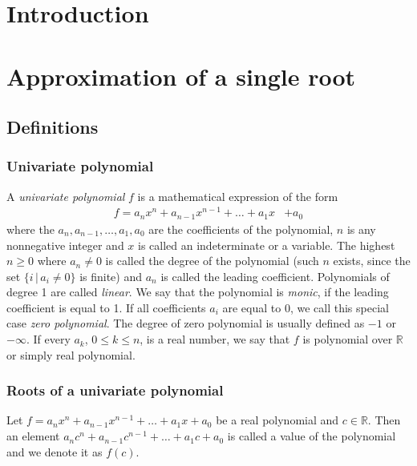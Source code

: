 \documentclass[
  digital, %
  notable,   %
  nolof,     %
  nolot,     %
	draft, %
]{fithesis3}
\begin{document}
\newtheorem{theorem}{Theorem}[section] %
\newtheorem{corollary}[theorem]{Corollary}
\chapter{Introduction}


\chapter{Approximation of a single root}
\section{Definitions}
\subsection{Univariate polynomial}
A \emph{univariate polynomial} $f$ is a mathematical expression of the form
\begin{align}
       f = a_{n}x^{n}  +  a_{n-1}x^{n-1} +  \ldots  +  a_{1}x  &+  a_{0} \label{eq:polynom}
\end{align}
\newcommand{\R}{\mathbb{R}}
\newcommand{\N}{\mathbb{N}}
where the $a_{n}, a_{n-1}, \ldots, a_{1}, a_{0}$  are the coefficients of the polynomial, $n$ is any nonnegative integer and $x$ is called an indeterminate or a variable.  The highest $n \geq 0$ where $a_{n} \neq 0$ is called the degree of the polynomial (such $n$ exists, since the set $\{i \, | \, a_{i} \neq 0 \}$ is finite) and $a_{n}$ is called the leading coefficient. Polynomials of degree 1 are called \emph{linear}. We say that the polynomial is \emph{monic}, if the leading coefficient is equal to 1. If all coefficients $a_{i}$ are equal to $0$, we call this special case \emph{zero polynomial}. The degree of zero polynomial is usually defined as $-1$ or $-\infty$. If every $a_{k}$, $0\leq{k}\leq{n}$, is a real number, we say that $f$ is polynomial over $\R$ or simply real polynomial.

\subsection{Roots of a univariate polynomial}
Let $f = a_{n}x^{n}  +  a_{n-1}x^{n-1} +  \ldots  +  a_{1}x  +  a_{0}$ be a real polynomial and $c\in\R$. Then an element $a_{n}c^{n}  +  a_{n-1}c^{n-1} +  \ldots  +  a_{1}c  +  a_{0}$ is called a value of the polynomial and we denote it as $f(c)$.
\end{document}
